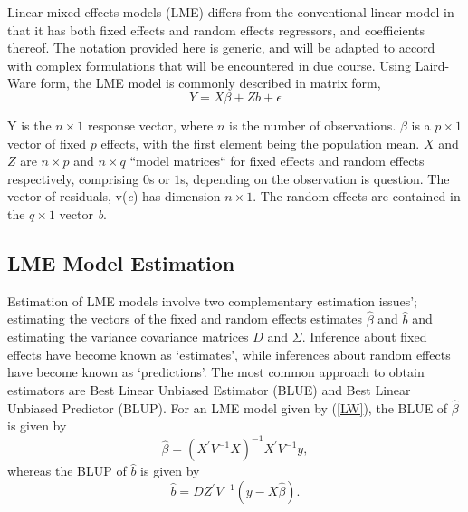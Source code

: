 \documentclass[12pt, a4paper]{report}
\theoremstyle{plain}
\theoremstyle{definition}
\theoremstyle{remark}
\begin{document}
	Linear mixed effects models (LME)
	differs from the conventional linear model in that it has both
	fixed effects and random effects regressors, and coefficients
	thereof. The notation provided here is generic, and will be adapted to accord with complex formulations that will be encountered in due course. Using Laird-Ware form, the LME model is commonly described in matrix form,
	\begin{equation}
	Y = X\beta + Zb + \epsilon
	\label{LW}
	\end{equation}
	
Y is the $n \times 1$ response vector, where  $n$ is the number of observations. \textit{$\beta$} is a $p \times 1$ vector of fixed $p$ effects, with the
	first element being the population mean. $X$ and $Z$ are $n \times p$ and $n \times q$ ``model matrices`` for fixed effects and random effects respectively, comprising
	$0$s or $1$s, depending on the observation is question. The vector of residuals, v(\textit{e}) has
	dimension $n \times 1$. The random effects are contained in the  $q \times
	1$ vector \textit{b}.
			
			
			
			
\subsection{LME Model Estimation}
Estimation of LME models involve two complementary estimation issues'; estimating the vectors of the fixed and random effects estimates $\hat{\beta}$ and $\hat{b}$ and estimating the variance covariance matrices $D$ and $\Sigma$. Inference about fixed effects have become known as `estimates', while inferences about random effects have become known as `predictions'. The most common approach to obtain estimators are Best Linear Unbiased Estimator (BLUE) and Best Linear Unbiased Predictor (BLUP). For an LME model given by (\ref{LW}), the BLUE of $\hat{\beta}$ is given by
\begin{equation}
\hat{\beta} = (X^\prime V^{-1}X)^{-1}X^\prime V^{-1}y,
\end{equation}whereas the BLUP of $\hat{b}$ is given by
\begin{equation}
\hat{b} = DZ^{\prime} V^{-1} (y-X\hat{\beta}).
\end{equation}
\end{document}
